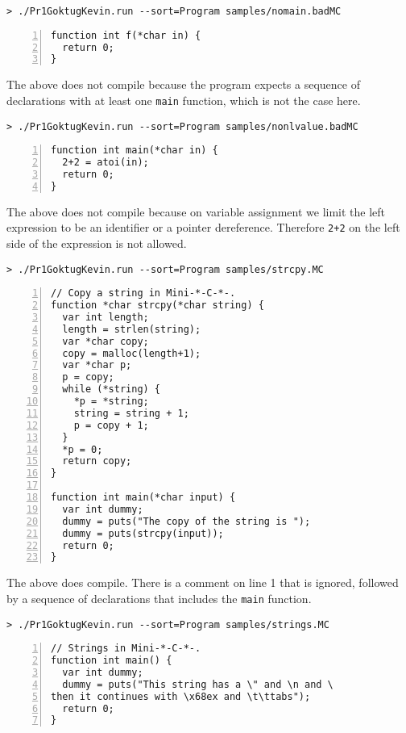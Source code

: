 \documentclass{article}
\begin{document}
\begin{verbatim}
> ./Pr1GoktugKevin.run --sort=Program samples/nomain.badMC
\end{verbatim}
\begin{Verbatim}[numbers=left,xleftmargin=5mm]
function int f(*char in) {
  return 0;
}
\end{Verbatim}

The above does not compile because the program expects a sequence of declarations with at least one \verb|main| function, which is not the case here.

\begin{verbatim}
> ./Pr1GoktugKevin.run --sort=Program samples/nonlvalue.badMC
\end{verbatim}
\begin{Verbatim}[numbers=left,xleftmargin=5mm]
function int main(*char in) {
  2+2 = atoi(in);
  return 0;
}
\end{Verbatim}

The above does not compile because on variable assignment we limit the left expression to be an identifier or a pointer dereference. Therefore \verb|2+2| on the left side of the expression is not allowed.

\begin{verbatim}
> ./Pr1GoktugKevin.run --sort=Program samples/strcpy.MC
\end{verbatim}
\begin{Verbatim}[numbers=left,xleftmargin=5mm]
// Copy a string in Mini-*-C-*-.
function *char strcpy(*char string) {
  var int length;
  length = strlen(string);
  var *char copy;
  copy = malloc(length+1);
  var *char p;
  p = copy;
  while (*string) {
    *p = *string;
    string = string + 1;
    p = copy + 1;
  }
  *p = 0;
  return copy;
}

function int main(*char input) {
  var int dummy;
  dummy = puts("The copy of the string is ");
  dummy = puts(strcpy(input));
  return 0;
}
\end{Verbatim}

The above does compile. There is a comment on line 1 that is ignored, followed by a sequence of declarations that includes the \verb|main| function.

\begin{verbatim}
> ./Pr1GoktugKevin.run --sort=Program samples/strings.MC
\end{verbatim}
\begin{Verbatim}[numbers=left,xleftmargin=5mm]
// Strings in Mini-*-C-*-.
function int main() {
  var int dummy;
  dummy = puts("This string has a \" and \n and \
then it continues with \x68ex and \t\ttabs");
  return 0;
}
\end{Verbatim}
\end{document}
